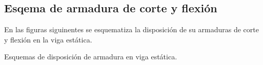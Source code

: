     \subsection{Esqema de armadura de corte y flexión}
    
    En las figuras siguinentes se esquematiza la disposición de su armaduras de corte y flexión en la viga estática.
    
    \begin{images}[\label{armadura}]{Esquemas de disposición de armadura en viga estática.}
    \end{images}    